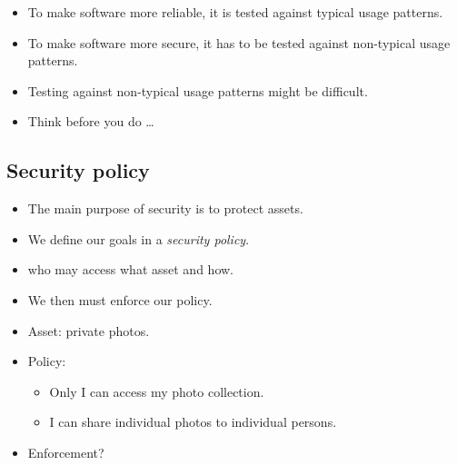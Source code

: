 \begin{frame}
  \begin{itemize}
    \item To make software more reliable, it is tested against typical usage 
      patterns.

    \item To make software more secure, it has to be tested against non-typical 
      usage patterns.

    \item Testing against non-typical usage patterns might be difficult.

    \item Think before you do \dots
  \end{itemize}
\end{frame}

\subsection{Security policy}

\begin{frame}
  \begin{itemize}
    \item The main purpose of security is to protect assets.

      \pause

    \item We define our goals in a \emph{security policy}.
    \item \Eg who may access what asset and how.

      \pause

    \item We then must enforce our policy.
  \end{itemize}
\end{frame}

\begin{frame}
  \begin{example}
    \begin{itemize}
      \item Asset: private photos.

      \item Policy:
        \begin{itemize}
          \item Only I can access my photo collection.
          \item I can share individual photos to individual persons.
        \end{itemize}

        \pause

      \item Enforcement?
    \end{itemize}
  \end{example}
\end{frame}

